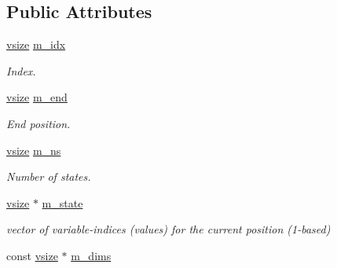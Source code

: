 \subsection*{Public Attributes}
\begin{DoxyCompactItemize}
\item 
\hypertarget{classmerlin_1_1superindex_a3d4b9e802f8716e5d18a542302a59bd5}{}\hyperlink{classmerlin_1_1superindex_a4e63d0617c6b351c664cdfd406686d62}{vsize} \hyperlink{classmerlin_1_1superindex_a3d4b9e802f8716e5d18a542302a59bd5}{m\+\_\+idx}\label{classmerlin_1_1superindex_a3d4b9e802f8716e5d18a542302a59bd5}

\begin{DoxyCompactList}\small\item\em Index. \end{DoxyCompactList}\item 
\hypertarget{classmerlin_1_1superindex_acb594096f91008dad86dff53b492420a}{}\hyperlink{classmerlin_1_1superindex_a4e63d0617c6b351c664cdfd406686d62}{vsize} \hyperlink{classmerlin_1_1superindex_acb594096f91008dad86dff53b492420a}{m\+\_\+end}\label{classmerlin_1_1superindex_acb594096f91008dad86dff53b492420a}

\begin{DoxyCompactList}\small\item\em End position. \end{DoxyCompactList}\item 
\hypertarget{classmerlin_1_1superindex_ad9d1dd710851f54d95bf0bab7c509d1a}{}\hyperlink{classmerlin_1_1superindex_a4e63d0617c6b351c664cdfd406686d62}{vsize} \hyperlink{classmerlin_1_1superindex_ad9d1dd710851f54d95bf0bab7c509d1a}{m\+\_\+ns}\label{classmerlin_1_1superindex_ad9d1dd710851f54d95bf0bab7c509d1a}

\begin{DoxyCompactList}\small\item\em Number of states. \end{DoxyCompactList}\item 
\hypertarget{classmerlin_1_1superindex_a4b799ea7b1fe4a42ff9dee3fb8563b01}{}\hyperlink{classmerlin_1_1superindex_a4e63d0617c6b351c664cdfd406686d62}{vsize} $\ast$ \hyperlink{classmerlin_1_1superindex_a4b799ea7b1fe4a42ff9dee3fb8563b01}{m\+\_\+state}\label{classmerlin_1_1superindex_a4b799ea7b1fe4a42ff9dee3fb8563b01}

\begin{DoxyCompactList}\small\item\em vector of variable-\/indices (values) for the current position (1-\/based) \end{DoxyCompactList}\item 
\hypertarget{classmerlin_1_1superindex_a8e430436cf84a3cb29724ed9f108aab3}{}const \hyperlink{classmerlin_1_1superindex_a4e63d0617c6b351c664cdfd406686d62}{vsize} $\ast$ \hyperlink{classmerlin_1_1superindex_a8e430436cf84a3cb29724ed9f108aab3}{m\+\_\+dims}\label{classmerlin_1_1superindex_a8e430436cf84a3cb29724ed9f108aab3}


\end{DoxyCompactItemize}
